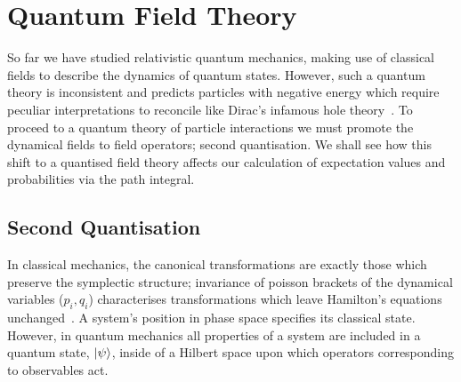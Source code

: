 \documentclass[11pt, a4paper]{article}
\begin{document}
\section{Quantum Field Theory}

So far we have studied relativistic quantum mechanics, making use of classical
fields to describe the dynamics of quantum states. However, such a quantum theory is
inconsistent and predicts particles with negative energy which require 
peculiar interpretations to reconcile like Dirac's infamous hole theory~\cite{Holethry}.
To proceed to a quantum theory of particle interactions we must promote the dynamical fields
to field operators; second quantisation. We shall see how this shift to
a quantised field theory affects our calculation of expectation values and probabilities
via the path integral.

\subsection{Second Quantisation}
In classical mechanics, the canonical transformations are exactly those which preserve the symplectic 
structure; invariance of poisson brackets of the dynamical variables ($p_i, q_i$) characterises
transformations which leave Hamilton's equations unchanged~\cite{LA&LI-Mech-VII}.
A system's position in phase space specifies its classical state.
However, in quantum mechanics all properties of a system are included in a quantum state, $\ket{\psi}$, 
inside of a Hilbert space upon which operators corresponding to observables act.
\end{document}
